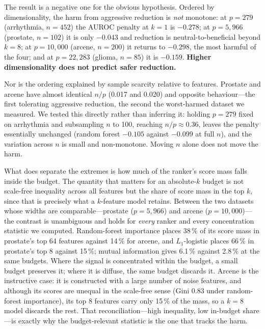 \documentclass[fleqn,10pt]{wlscirep}
\newcommand{\result}[1]{#1}
\begin{document}
The result is a negative one for the obvious hypothesis. Ordered by dimensionality, the harm from
aggressive reduction is \emph{not} monotone: at $p=\result{279}$ (arrhythmia, $n=\result{452}$) the
AUROC penalty at $k=1$ is \result{$-0.278$}; at $p=\result{5{,}966}$ (prostate, $n=\result{102}$) it
is only \result{$-0.043$} and reduction is neutral-to-beneficial beyond $k=8$; at
$p=\result{10{,}000}$ (arcene, $n=\result{200}$) it returns to \result{$-0.298$}, the most harmful of
the four; and at $p=\result{22{,}283}$ (glioma, $n=\result{85}$) it is \result{$-0.159$}.
\textbf{Higher dimensionality does not predict safer reduction.}

Nor is the ordering explained by sample scarcity relative to features. Prostate and arcene have
almost identical $n/p$ (\result{0.017} and \result{0.020}) and opposite behaviour---the first
tolerating aggressive reduction, the second the worst-harmed dataset we measured. We tested this
directly rather than inferring it: holding $p=\result{279}$ fixed on arrhythmia and subsampling $n$
to \result{100}, reaching $n/p\approx\result{0.36}$, leaves the penalty essentially unchanged
(random forest \result{$-0.105$} against \result{$-0.099$} at full $n$), and the variation across
$n$ is small and non-monotone. Moving $n$ alone does not move the harm.

What does separate the extremes is how much of the ranker's score mass falls inside the budget. The
quantity that matters for an absolute-$k$ budget is not scale-free inequality across all features but
the share of score mass in the top $k$, since that is precisely what a $k$-feature model retains.
Between the two datasets whose widths are comparable---prostate ($p=\result{5{,}966}$) and arcene
($p=\result{10{,}000}$)---the contrast is unambiguous and holds for \emph{every} ranker and every
concentration statistic we computed. Random-forest importance places \result{38\,\%} of its score mass
in prostate's top \result{64} features against \result{14\,\%} for arcene, and $L_1$-logistic places
\result{66\,\%} in prostate's top \result{8} against \result{15\,\%}; mutual information gives
\result{6.1\,\%} against \result{2.8\,\%} at the same budgets. Where the signal is concentrated within
the budget, a small budget preserves it; where it is diffuse, the same budget discards it. Arcene is
the instructive case: it is constructed with a large number of noise features, and although its scores
are unequal in the scale-free sense (Gini \result{0.83} under random-forest importance), its top
\result{8} features carry only \result{15\,\%} of the mass, so a $k=8$ model discards the rest. That
reconciliation---high inequality, low in-budget share---is exactly why the budget-relevant statistic is
the one that tracks the harm.
\end{document}
